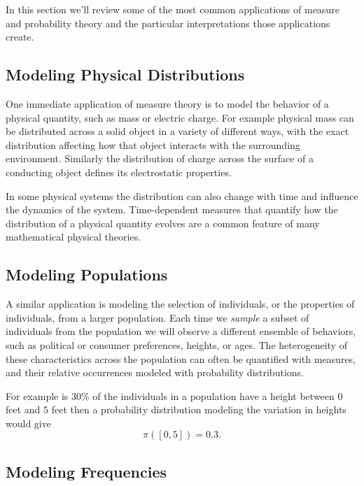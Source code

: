 \documentclass[
  letterpaper,
  DIV=11,
  numbers=noendperiod]{scrartcl}
\begin{document}
In this section we'll review some of the most common applications of
measure and probability theory and the particular interpretations those
applications create.

\hypertarget{modeling-physical-distributions}{%
\subsection{Modeling Physical
Distributions}\label{modeling-physical-distributions}}

One immediate application of measure theory is to model the behavior of
a physical quantity, such as mass or electric charge. For example
physical mass can be distributed across a solid object in a variety of
different ways, with the exact distribution affecting how that object
interacts with the surrounding environment. Similarly the distribution
of charge across the surface of a conducting object defines its
electrostatic properties.

In some physical systems the distribution can also change with time and
influence the dynamics of the system. Time-dependent measures that
quantify how the distribution of a physical quantity evolves are a
common feature of many mathematical physical theories.

\hypertarget{modeling-populations}{%
\subsection{Modeling Populations}\label{modeling-populations}}

A similar application is modeling the selection of individuals, or the
properties of individuals, from a larger population. Each time we
\emph{sample} a subset of individuals from the population we will
observe a different ensemble of behaviors, such as political or consumer
preferences, heights, or ages. The heterogeneity of these
characteristics across the population can often be quantified with
measures, and their relative occurrences modeled with probability
distributions.

For example is \(30\%\) of the individuals in a population have a height
between \(0\) feet and \(5\) feet then a probability distribution
modeling the variation in heights would give \[
\pi([0, 5]) = 0.3.
\]

\hypertarget{modeling-frequencies}{%
\subsection{Modeling Frequencies}\label{modeling-frequencies}}
\end{document}
